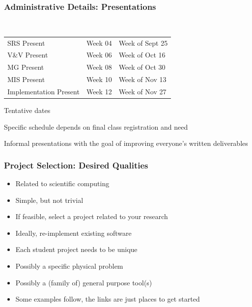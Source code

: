 \documentclass[t,12pt,numbers,fleqn]{beamer}
\begin{document}

\begin{frame}
\frametitle{Administrative Details: Presentations}

~\newline
\begin{tabular}{l l l}
SRS Present & Week 04 & Week of Sept 25\\
V\&V Present & Week 06 & Week of Oct 16\\
MG Present & Week 08 & Week of Oct 30\\
MIS Present & Week 10 & Week of Nov 13\\
Implementation Present & Week 12 & Week of Nov 27\\
\end {tabular}

\bi
\item Tentative dates
\item Specific schedule depends on final class registration and need
\item Informal presentations with the goal of improving everyone's written
  deliverables
\ei

\end{frame}


\begin{frame}
\frametitle{Project Selection: Desired Qualities}
\begin{itemize}
\item Related to scientific computing
\item Simple, but not trivial
\item If feasible, select a project related to your research
\item Ideally, re-implement existing software
\item Each student project needs to be unique
\item Possibly a specific physical problem
\item Possibly a (family of) general purpose tool(s)
\item Some examples follow, the links are just places to get started
\end{itemize}
\end{frame}

\end{document}
